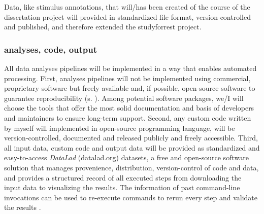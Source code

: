 \begin{comment} \citep{dupre2020nature}:
%
Study Forrest is a data collection and curation effort designed to serve as a
    community resource for new discoveries.
%
As of October 2019, 29 unique studies had been published using the
    studyforrest.org dataset, 17 of which were published without any of the
    original authors of the data release.
%
This is possible in large part thanks to the richness of naturalistic stimuli,
    where the same movie can be used for both task-free as well as
    stimulus-driven analyses, with the original stimulus re-annotated for
    particular features of interest.
%
For example, studyforrest.org has been used to test cerebrovascular biomarkers
    (Voss et al., 2017) but, among other features, was also annotated for
    expressed emotion (Labs et al., 2015) which later informed a study on
    emotion encoding gradients in the brain (Lettieri et al., 2019)''
    \citep{dupre2020nature}.
%
\end{comment}
%
Data, like stimulus annotations, that will/has been created of the course of the
dissertation project will provided in standardized file format,
version-controlled and published, and therefore extended the studyforrest
project.

%
\subsubsection{analyses, code, output}

%
All data analyses pipelines will be implemented in a way that enables automated
processing.
%
First, analyses pipelines will not be implemented using commercial, proprietary
software but freely available and, if possible, open-source software to
guarantee reproducibility (s. \citep{eglen2017toward}).
Among potential software packages, we/I will choose the tools that offer the
most solid documentation and basis of developers and maintainers to ensure
long-term support.
Second, any custom code written by myself will implemented in open-source
programming language, will be version-controlled, documented and released
publicly and freely accessible.
%
Third, all input data, custom code and output data will be provided as
standardized and easy-to-access \textit{DataLad} (datalad.org) datasets, a free
and open-source software solution that manages provenience, distribution,
version-control of code and data, and provides a structured record of all
executed steps from downloading the input data to visualizing the results. The
information of past command-line invocations can be used to re-execute commands
to rerun every step and validate the results
\citep{halchenko2021datalad}.

